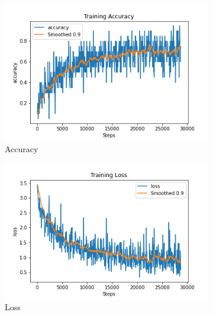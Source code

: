 \begin{figure}[H]
     \centering
     \begin{subfigure}[b]{0.3\textwidth}
         \centering
         \includegraphics[width=\textwidth]{./figure/results/baseline_and_blindfolding/training/accuracy.png}
         \caption{Accuracy}
         \label{fig:training_accuracy}
     \end{subfigure}
     \hfill
     \begin{subfigure}[b]{0.3\textwidth}
         \centering
         \includegraphics[width=\textwidth]{./figure/results/baseline_and_blindfolding/training/loss.png}
         \caption{Loss}
         \label{fig:training_loss}
     \end{subfigure}
     \hfill
     \begin{subfigure}[b]{0.3\textwidth}
         \centering

\end{subfigure}
\end{figure}
